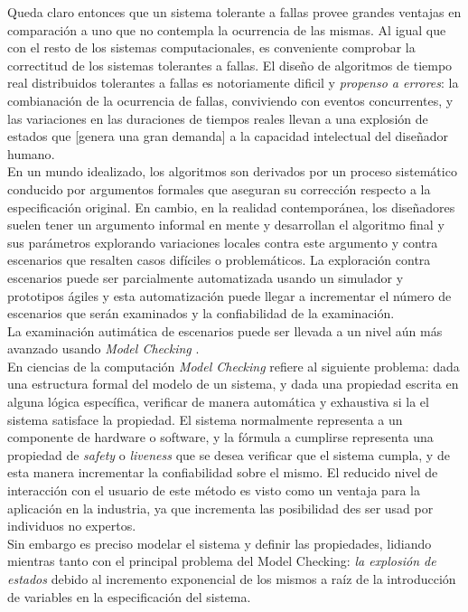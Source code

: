 \documentclass[titlepage, 12pt]{book}
\begin{document}
Queda claro entonces que un sistema tolerante a fallas provee grandes ventajas en comparaci\'on a uno que no contempla la ocurrencia de las mismas. Al igual que con el resto de los sistemas computacionales, es conveniente comprobar la correctitud de los sistemas tolerantes a fallas.
El dise\~no de algoritmos de tiempo real distribuidos tolerantes a fallas es notoriamente dificil y \emph{propenso a errores}: la combianaci\'on de la ocurrencia de fallas, conviviendo con eventos concurrentes, y las variaciones en las duraciones de tiempos reales llevan a una explosi\'on de estados que [genera una gran demanda] a la capacidad intelectual del dise\~nador humano\cite{SteinerRushby}.\\
En un mundo idealizado, los algoritmos son derivados por un proceso sistem\'atico conducido por argumentos formales que aseguran su correcci\'on respecto a la especificaci\'on original. En cambio, en la realidad contempor\'anea, los dise\~nadores suelen tener un argumento informal en mente y desarrollan el algoritmo final y sus par\'ametros explorando variaciones locales contra este argumento y contra escenarios que resalten casos dif\'iciles o problem\'aticos. La exploraci\'on contra escenarios puede ser parcialmente automatizada usando un simulador y prototipos \'agiles y esta automatizaci\'on puede llegar a incrementar el n\'umero de escenarios que ser\'an examinados y la confiabilidad de la examinaci\'on.\\ La examinaci\'on autim\'atica de escenarios puede ser llevada a un nivel a\'un m\'as avanzado usando \emph{Model Checking} \cite{SteinerRushby}.\\

En ciencias de la computaci\'on \emph{Model Checking} refiere al siguiente problema: dada una estructura formal del modelo de un sistema, y dada una propiedad escrita en alguna l\'ogica espec\'ifica, verificar de manera autom\'atica y exhaustiva si la el sistema satisface la propiedad. El sistema normalmente representa a un componente de hardware o software, y la f\'ormula a cumplirse representa una propiedad de \emph{safety} o \emph{liveness} que se desea verificar que el sistema cumpla, y de esta manera incrementar la confiabilidad sobre el mismo.
El reducido nivel de interacci\'on con el usuario de este m\'etodo es visto como un ventaja para la aplicaci\'on en la industria, ya que incrementa las posibilidad des ser usad por individuos no expertos\cite{RuysBrinksma}.\\
Sin embargo es preciso modelar el sistema y definir las propiedades, lidiando mientras tanto con el principal problema del Model Checking: \emph{la explosi\'on de estados} debido al incremento exponencial de los mismos a ra\'iz de la introducci\'on de variables en la especificaci\'on del sistema.\\
\end{document}
